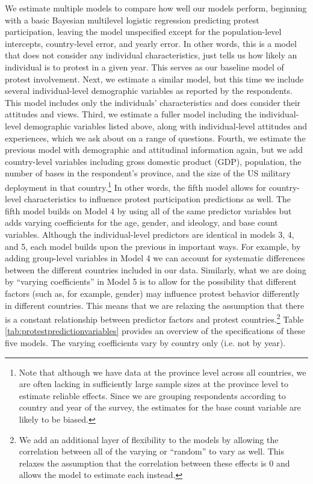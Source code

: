 We estimate multiple models to compare how well our models perform, beginning with a basic Bayesian multilevel logistic regression predicting protest participation, leaving the model unspecified except for the population-level intercepts, country-level error, and yearly error. In other words, this is a model that does not consider any individual characteristics, just tells us how likely an individual is to protest in a given year. This serves as our baseline model of protest involvement. Next, we estimate a similar model, but this time we include several individual-level demographic variables as reported by the respondents. This model includes only the individuals' characteristics and does consider their attitudes and views. Third, we estimate a fuller model including the individual-level demographic variables listed above, along with individual-level attitudes and experiences, which we ask about on a range of questions. Fourth, we estimate the previous model with demographic and attitudinal information again, but we add country-level variables including gross domestic product (GDP), population, the number of bases in the respondent's province, and the size of the US military deployment in that country.\footnote{Note that although we have data at the province level across all countries, we are often lacking in sufficiently large sample sizes at the province level to estimate reliable effects. Since we are grouping respondents according to country and year of the survey, the estimates for the base count variable are likely to be biased.} In other words, the fifth model allows for country-level characteristics to influence protest participation predictions as well. The fifth model builds on Model 4 by using all of the same predictor variables but adds varying coefficients for the age, gender, and ideology, and base count variables. Although the individual-level predictors are identical in models 3, 4, and 5, each model builds upon the previous in important ways. For example, by adding group-level variables in Model 4 we can account for systematic differences between the different countries included in our data. Similarly, what we are doing by ``varying coefficients'' in Model 5 is to allow for the possibility that different factors (such as, for example, gender) may influence protest behavior differently in different countries.  
This means that we are relaxing the assumption that there is a constant relationship between predictor factors and protest countries.\footnote{We add an additional layer of flexibility to the models by allowing the correlation between all of the varying or ``random'' to vary as well. This relaxes the assumption that the correlation between these effects is 0 and allows the model to estimate each instead.} Table \ref{tab:protestpredictionvariables} provides an overview of the specifications of these five models. The varying coefficients vary by country only (i.e. not by year). 


